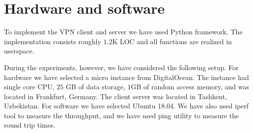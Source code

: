 \section{Hardware and software}
\label{sec:hardware}

To implement the VPN client and server we have used Python framework. The implementation
consists roughly $1.2$K LOC and all functions are realized in userspace.

During the experiments, however, we have considered the following setup.
For hardware we have selected a micro instance from DigitalOcean. The instance had 
single core CPU, $25$ GB of data storage, $1$GB of random access memory, and was 
located in Frankfurt, Germany. The client server was located in Tashkent, Uzbekistan. 
For software we have selected Ubuntu 18.04. We have also used iperf tool 
to measure the throughput, and we have used ping utility to measure the round trip times. 

